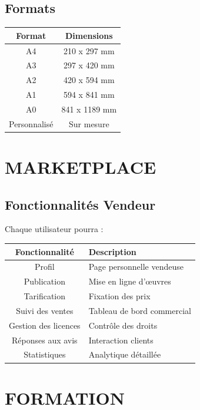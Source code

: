 \documentclass[12pt,a4paper,oneside]{book}
\begin{document}
\section{Formats}
\begin{center}
\begin{tabular}{|c|c|}
\hline
\rowcolor{electronpurple}
\color{white}\textbf{Format} & \color{white}\textbf{Dimensions} \\
\hline
A4 & 210 x 297 mm \\
\hline
A3 & 297 x 420 mm \\
\hline
A2 & 420 x 594 mm \\
\hline
A1 & 594 x 841 mm \\
\hline
A0 & 841 x 1189 mm \\
\hline
Personnalisé & Sur mesure \\
\hline
\end{tabular}
\end{center}

\chapter{MARKETPLACE}

\section{Fonctionnalités Vendeur}
Chaque utilisateur pourra :
\begin{center}
\begin{tabular}{|c|p{10cm}|}
\hline
\rowcolor{electroncyan}
\color{white}\textbf{Fonctionnalité} & \color{white}\textbf{Description} \\
\hline
Profil & Page personnelle vendeuse \\
\hline
Publication & Mise en ligne d'œuvres \\
\hline
Tarification & Fixation des prix \\
\hline
Suivi des ventes & Tableau de bord commercial \\
\hline
Gestion des licences & Contrôle des droits \\
\hline
Réponses aux avis & Interaction clients \\
\hline
Statistiques & Analytique détaillée \\
\hline
\end{tabular}
\end{center}

\chapter{FORMATION}
\end{document}
